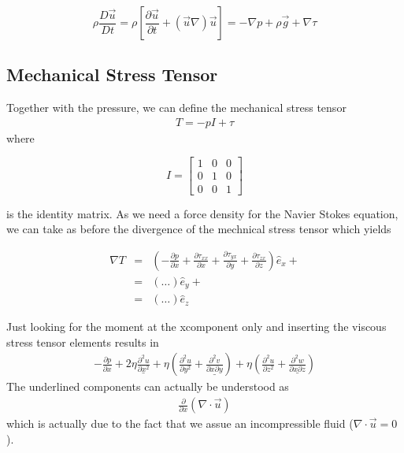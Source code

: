 \documentclass[letterpaper,10pt,english]{sphinxmanual}
\begin{document}
\sphinxAtStartPar
\begin{equation}
\rho \frac{D\vec{u}}{Dt}=\rho \left [\frac{\partial \vec{u}}{\partial t} +(\vec{u}\nabla)\vec{u}\right ]=-\nabla p + \rho \vec{g} +\nabla \tau
\end{equation}


\subsection{Mechanical Stress Tensor}
\label{\detokenize{notebooks/L17/1_hydrodynamics:Mechanical-Stress-Tensor}}
\sphinxAtStartPar
Together with the pressure, we can define the mechanical stress tensor
\begin{equation*}
\begin{split}T=-pI +\tau\end{split}
\end{equation*}
\sphinxAtStartPar
where

\sphinxAtStartPar
\begin{equation}
I=\begin{bmatrix}
1 & 0 & 0\\
0 & 1 & 0\\
0 & 0 & 1
\end{bmatrix}
\end{equation}

\sphinxAtStartPar
is the identity matrix. As we need a force density for the Navier Stokes equation, we can take as before the divergence of the mechnical stress tensor which yields

\sphinxAtStartPar
\begin{eqnarray}
\nabla T &=&\left ( -\frac{\partial p}{\partial x} +\frac{\partial \tau_{xx}}{\partial x}+\frac{\partial \tau_{yx}}{\partial y}+\frac{\partial \tau_{zx}}{\partial z}\right)\hat{e}_x+\\
&=& \left (\ldots \right )\hat{e}_y+ \\
&=& \left ( \ldots \right ) \hat{e}_z
\end{eqnarray}

\sphinxAtStartPar
Just looking for the moment at the x\sphinxhyphen{}component only and inserting the viscous stress tensor elements results in
\begin{equation*}
\begin{split}-\frac{\partial p}{\partial x}+2\eta \underline{\frac{\partial^2 u }{\partial x^2}}+ \eta \left ( \frac{\partial^2 u }{\partial y^2}+\underline{\frac{\partial^2 v }{\partial x \partial y}}\right)+ \eta \left ( \frac{\partial^2 u }{\partial z^2}+\underline{\frac{\partial^2 w }{\partial x \partial z}}\right)\end{split}
\end{equation*}
\sphinxAtStartPar
The underlined components can actually be understood as
\begin{equation*}
\begin{split}\frac{\partial }{\partial x}(\nabla \cdot \vec{u})\end{split}
\end{equation*}
\sphinxAtStartPar
which is actually  due to the fact that we assue an incompressible fluid (\(\nabla\cdot \vec{u}=0\)).
\end{document}
